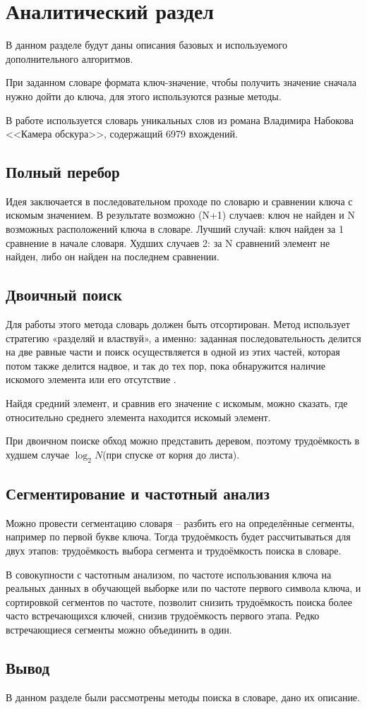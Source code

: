 \chapter{Аналитический раздел}
\label{cha:analysis}
В данном разделе будут даны описания базовых и используемого дополнительного алгоритмов. 
\par При заданном словаре формата ключ-значение, чтобы получить значение сначала нужно дойти до ключа, для этого используются разные методы.
\par В работе используется словарь уникальных слов из романа Владимира Набокова <<Камера обскура>>, содержащий 6979 вхождений.

\section{Полный перебор}
\label{sec:fullsearch}
Идея заключается в последовательном проходе по словарю и сравнении ключа с искомым значением. В результате возможно (N+1) случаев: ключ не найден и N возможных расположений ключа в словаре. Лучший случай: ключ найден за 1 сравнение в начале словаря. Худших случаев 2: за N сравнений элемент не найден, либо он найден на последнем сравнении.
\section{Двоичный поиск}
\label{sec:binsearch}
Для работы этого метода словарь должен быть отсортирован. Метод использует стратегию «разделяй и властвуй», а именно: заданная последовательность делится на две равные части и поиск осуществляется в одной из этих частей, которая потом также делится надвое, и так до тех пор, пока обнаружится наличие искомого элемента или его отсутствие \cite{binsearch}.
\par Найдя средний элемент, и сравнив его значение с искомым, можно сказать, где относительно среднего элемента находится искомый элемент.
\par При двоичном поиске обход можно представить деревом, поэтому трудоёмкость в худшем случае $\log_{2}N$(при спуске от корня до листа).

\section{Сегментирование и частотный анализ}
\label{sec:segment}
Можно провести сегментацию словаря -- разбить его на определённые сегменты, например по первой букве ключа. Тогда трудоёмкость будет рассчитываться для двух этапов: трудоёмкость выбора сегмента и трудоёмкость поиска в словаре.
\par В совокупности с частотным анализом, по частоте использования ключа на реальных данных в обучающей выборке или по частоте первого символа ключа, и сортировкой сегментов по частоте, позволит снизить трудоёмкость поиска более часто встречающихся ключей, снизив трудоёмкость первого этапа. Редко встречающиеся сегменты можно объединить в один.

\section{Вывод}
\label{sec:res}
В данном разделе были рассмотрены методы поиска в словаре, дано их описание.
